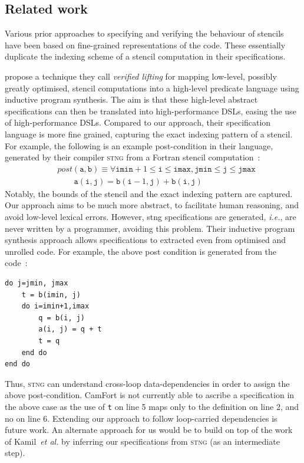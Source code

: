 \documentclass[9pt]{sigplanconf}
\theoremstyle{definition}
\newcommand{\ie}{\emph{i.e.}}
\begin{document}
\subsection{Related work}

Various prior approaches to specifying and verifying the behaviour
of stencils have been based on fine-grained representations of the
code. These essentially duplicate the indexing scheme of a stencil
computation in their specifications.

\citet{kamil2016verified} propose a technique they call
\emph{verified lifting} for mapping low-level, possibly
greatly optimised, stencil computations into a high-level
predicate language using inductive program synthesis.
The aim is that these high-level abstract specifications can
then be translated into high-performance DSLs, easing the
use of high-performance DSLs. Compared to our approach,
their specification language is more fine grained, capturing
the exact indexing pattern of a stencil. For example, the following
is an example post-condition in their language, generated by their
compiler \textsc{stng} from a Fortran stencil computation~\cite [p.3]{kamil2016verified}:
%
\begin{align*}
& \textit{post}(\texttt{a}, \texttt{b}) \equiv \forall \texttt{imin}+1
\leq \texttt{i} \leq \texttt{imax}, \texttt{jmin} \leq \texttt{j} \leq
\texttt{jmax} \\
& \qquad \texttt{a}(\texttt{i},\texttt{j}) =
\texttt{b}(\texttt{i}-1,\texttt{j}) + \texttt{b}(\texttt{i},\texttt{j})
\end{align*}
%
Notably, the bounds of the stencil and the exact indexing pattern
are captured. Our approach aims to be much more abstract, to
facilitate human reasoning, and avoid low-level lexical
errors. However, \textsf{stng} specifications are generated, \ie{},
are never written by a programmer, avoiding this
problem. Their inductive program synthesis approach allows
specifications to extracted even from optimised and unrolled code. For
example, the above post condition is generated from the code~\cite [p.3]{kamil2016verified}:
%
\begin{verbatim}
do j=jmin, jmax
    t = b(imin, j)
    do i=imin+1,imax
        q = b(i, j)
        a(i, j) = q + t
        t = q
    end do
end do
\end{verbatim}
%
Thus, \textsc{stng} can understand cross-loop data-dependencies
in order to assign the above post-condition. CamFort is not currently
able to ascribe a specification in the above case as the use of
\texttt{t} on line 5 maps only to the definition on line 2, and no on
line 6. Extending our approach to follow loop-carried dependencies is
future work. An alternate approach for us would be to build on top of
the work of Kamil~\emph{et al.} by inferring our specifications from
\textsc{stng} (as an intermediate step).
\end{document}
